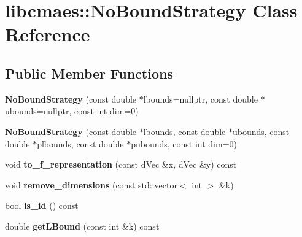 \hypertarget{classlibcmaes_1_1NoBoundStrategy}{\section{libcmaes\+:\+:No\+Bound\+Strategy Class Reference}
\label{classlibcmaes_1_1NoBoundStrategy}
}
\subsection*{Public Member Functions}
\begin{DoxyCompactItemize}
\item 
\hypertarget{classlibcmaes_1_1NoBoundStrategy_a726bc7b1e9f5dbde5ad97757ed94e470}{{\bfseries No\+Bound\+Strategy} (const double $\ast$lbounds=nullptr, const double $\ast$ubounds=nullptr, const int dim=0)}\label{classlibcmaes_1_1NoBoundStrategy_a726bc7b1e9f5dbde5ad97757ed94e470}

\item 
\hypertarget{classlibcmaes_1_1NoBoundStrategy_ab0c440259f9f29e384a671dc00dd1edc}{{\bfseries No\+Bound\+Strategy} (const double $\ast$lbounds, const double $\ast$ubounds, const double $\ast$plbounds, const double $\ast$pubounds, const int dim=0)}\label{classlibcmaes_1_1NoBoundStrategy_ab0c440259f9f29e384a671dc00dd1edc}

\item 
\hypertarget{classlibcmaes_1_1NoBoundStrategy_a766c30a177076c46b89be463ce1f3062}{void {\bfseries to\+\_\+f\+\_\+representation} (const d\+Vec \&x, d\+Vec \&y) const }\label{classlibcmaes_1_1NoBoundStrategy_a766c30a177076c46b89be463ce1f3062}

\item 
\hypertarget{classlibcmaes_1_1NoBoundStrategy_a794ea2413b2bab1c526efa7b798d007d}{void {\bfseries remove\+\_\+dimensions} (const std\+::vector$<$ int $>$ \&k)}\label{classlibcmaes_1_1NoBoundStrategy_a794ea2413b2bab1c526efa7b798d007d}

\item 
\hypertarget{classlibcmaes_1_1NoBoundStrategy_ab958ca559a599c69b4f01005efb3b59e}{bool {\bfseries is\+\_\+id} () const }\label{classlibcmaes_1_1NoBoundStrategy_ab958ca559a599c69b4f01005efb3b59e}

\item 
\hypertarget{classlibcmaes_1_1NoBoundStrategy_a9f2fe5e1b64188118add2e8e00603ba3}{double {\bfseries get\+L\+Bound} (const int \&k) const }\label{classlibcmaes_1_1NoBoundStrategy_a9f2fe5e1b64188118add2e8e00603ba3}


\end{DoxyCompactItemize}
